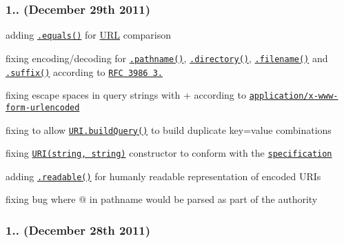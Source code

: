 \subsubsection*{1.. (December 29th 2011)}


\begin{DoxyItemize}
\item adding \href{http://medialize.github.io/URI.js/docs.html#equals}{\tt {\ttfamily .equals()}} for \mbox{\hyperlink{namespace_u_r_l}{U\+RL}} comparison
\item fixing encoding/decoding for \href{http://medialize.github.io/URI.js/docs.html#accessors-pathname}{\tt {\ttfamily .pathname()}}, \href{http://medialize.github.io/URI.js/docs.html#accessors-directory}{\tt {\ttfamily .directory()}}, \href{http://medialize.github.io/URI.js/docs.html#accessors-filename}{\tt {\ttfamily .filename()}} and \href{http://medialize.github.io/URI.js/docs.html#accessors-suffix}{\tt {\ttfamily .suffix()}} according to \href{http://tools.ietf.org/html/rfc3986#section-3.3}{\tt R\+FC 3986 3.}
\item fixing escape spaces in query strings with {\ttfamily +} according to \href{http://www.w3.org/TR/REC-html40/interact/forms.html#form-content-type}{\tt application/x-\/www-\/form-\/urlencoded}
\item fixing to allow \href{http://medialize.github.io/URI.js/docs.html#static-buildQuery}{\tt {\ttfamily U\+R\+I.\+build\+Query()}} to build duplicate key=value combinations
\item fixing \href{http://medialize.github.io/URI.js/docs.html#constructor}{\tt {\ttfamily U\+R\+I(string, string)}} constructor to conform with the \href{http://dvcs.w3.org/hg/url/raw-file/tip/Overview.html#constructor}{\tt specification}
\item adding \href{http://medialize.github.io/URI.js/docs.html#readable}{\tt {\ttfamily .readable()}} for humanly readable representation of encoded U\+R\+Is
\item fixing bug where @ in pathname would be parsed as part of the authority
\end{DoxyItemize}

\subsubsection*{1.. (December 28th 2011)}


